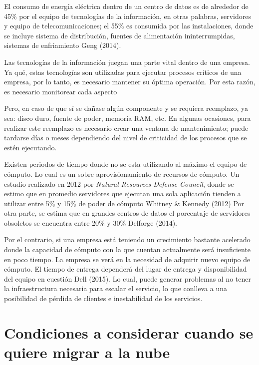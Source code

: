 \documentclass[12pt,twoside]{reedthesis}
\begin{document}
El consumo de energía eléctrica dentro de un centro de datos es de alrededor de 45\% por el equipo de tecnologías de la información, en otras palabras, servidores y equipo de telecomunicaciones; el 55\% es consumida por las instalaciones, donde se incluye sistema de distribución, fuentes de alimentación ininterrumpidas, sistemas de enfriamiento Geng (2014).

Las tecnologías de la información juegan una parte vital dentro de una empresa. Ya qué, estas tecnologías son utilizadas para ejecutar procesos críticos de una empresa, por lo tanto, es necesario mantener su óptima operación.
Por esta razón, es necesario monitorear cada aspecto

Pero, en caso de que sí se dañase algún componente y se requiera reemplazo, ya sea: disco duro, fuente de poder, memoria RAM, etc. En algunas ocasiones, para realizar este reemplazo es necesario crear una ventana de mantenimiento; puede tardarse días o meses dependiendo del nivel de criticidad de los procesos que se estén ejecutando.

Existen periodos de tiempo donde no se esta utilizando al máximo el equipo de cómputo. Lo cual es un sobre aprovisionamiento de recursos de cómputo. Un estudio realizado en 2012 por \emph{Natural Resources Defense Council}, donde se estimo que en promedio servidores que ejecutan una sola aplicación tienden a utilizar entre 5\% y 15\% de poder de cómputo Whitney \& Kennedy (2012)
Por otra parte, se estima que en grandes centros de datos el porcentaje de servidores obsoletos se encuentra entre 20\% y 30\% Delforge (2014).

Por el contrario, si una empresa está teniendo un crecimiento bastante acelerado donde la capacidad de cómputo con la que cuentan actualmente será insuficiente en poco tiempo. La empresa se verá en la necesidad de adquirir nuevo equipo de cómputo. El tiempo de entrega dependerá del lugar de entrega y disponibilidad del equipo en cuestión Dell (2015). Lo cual, puede generar problemas al no tener la infraestructura necesaria para escalar el servicio, lo que conlleva a una posibilidad de pérdida de clientes e inestabilidad de los servicios.

\hypertarget{condiciones-a-considerar-cuando-se-quiere-migrar-a-la-nube}{%
\section{Condiciones a considerar cuando se quiere migrar a la nube}\label{condiciones-a-considerar-cuando-se-quiere-migrar-a-la-nube}}
\end{document}

